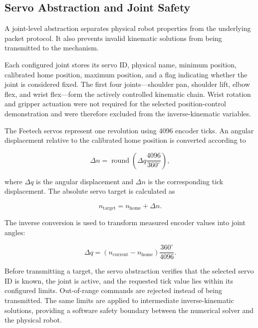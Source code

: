 \subsection{Servo Abstraction and Joint Safety}

A joint-level abstraction separates physical robot properties from the underlying packet protocol. It also prevents invalid kinematic solutions from being transmitted to the mechanism.

Each configured joint stores its servo ID, physical name, minimum position, calibrated home position, maximum position, and a flag indicating whether the joint is considered fixed. The first four joints---shoulder pan, shoulder lift, elbow flex, and wrist flex---form the actively controlled kinematic chain. Wrist rotation and gripper actuation were not required for the selected position-control demonstration and were therefore excluded from the inverse-kinematic variables.

The Feetech servos represent one revolution using 4096 encoder ticks. An angular displacement relative to the calibrated home position is converted according to

\begin{equation}
    \Delta n =
    \operatorname{round}
    \left(
        \Delta q \frac{4096}{360^{\circ}}
    \right),
    \label{eq:angle_to_ticks}
\end{equation}

where \(\Delta q\) is the angular displacement and \(\Delta n\) is the corresponding tick displacement. The absolute servo target is calculated as

\begin{equation}
    n_{\mathrm{target}} =
    n_{\mathrm{home}} + \Delta n.
    \label{eq:absolute_servo_target}
\end{equation}

The inverse conversion is used to transform measured encoder values into joint angles:

\begin{equation}
    \Delta q =
    \left(
        n_{\mathrm{current}} - n_{\mathrm{home}}
    \right)
    \frac{360^{\circ}}{4096}.
    \label{eq:ticks_to_angle}
\end{equation}

Before transmitting a target, the servo abstraction verifies that the selected servo ID is known, the joint is active, and the requested tick value lies within its configured limits. Out-of-range commands are rejected instead of being transmitted. The same limits are applied to intermediate inverse-kinematic solutions, providing a software safety boundary between the numerical solver and the physical robot.

